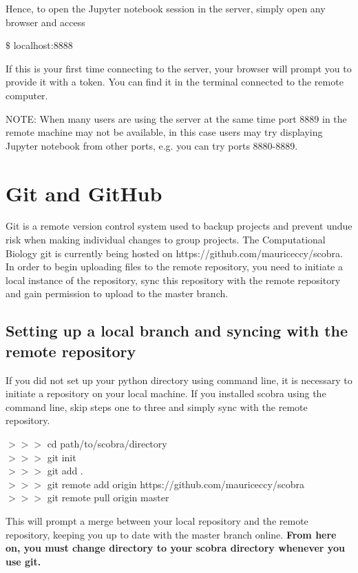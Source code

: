 Hence, to open the Jupyter notebook session in the server, simply open any browser and access

\begin{framed}
$\$$ localhost:8888
\end{framed}

If this is your first time connecting to the server, your browser will prompt you to provide it with a token. You can find it in the terminal connected to the remote computer.

NOTE: When many users are using the server at the same time port 8889 in the remote machine may not be available, in this case users may try displaying Jupyter notebook from other ports, e.g. you can try ports 8880-8889.


\section{Git and GitHub}
Git is a remote version control system used to backup projects and prevent undue risk when making individual changes to group projects. The Computational Biology git is currently being hosted on https://github.com/mauriceccy/scobra. In order to begin uploading files to the remote repository, you need to initiate a local instance of the repository, sync this repository with the remote repository and gain permission to upload to the master branch.

\subsection{Setting up a local branch and syncing with the remote repository}

If you did not set up your python directory using command line, it is necessary to initiate a repository on your local machine. If you installed scobra using the command line, skip steps one to three and simply sync with the remote repository.

\begin{mdframed}
$>>>$ \quad cd path/to/scobra/directory\\
$>>>$ \quad git init\\
$>>>$ \quad git add .\\
$>>>$ \quad git remote add origin https://github.com/mauriceccy/scobra\\
$>>>$ \quad git remote pull origin master
\end{mdframed}

This will prompt a merge between your local repository and the remote repository, keeping you up to date with the master branch online.
\textbf{From here on, you must change directory to your scobra directory whenever you use git.}
